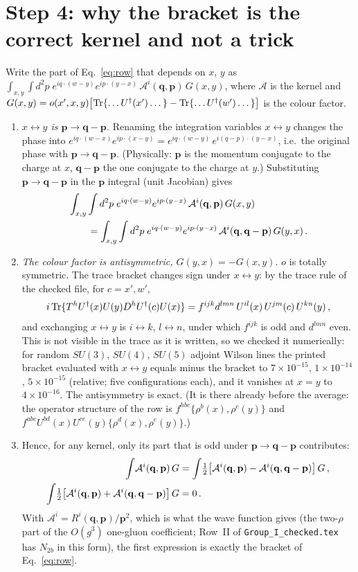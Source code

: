 \documentclass[11pt]{article}
\newcommand{\vq}{\mathbf{q}}
\newcommand{\vp}{\mathbf{p}}
\newcommand{\Tr}{{\rm Tr}}
\begin{document}
\section{Step 4: why the bracket is the correct kernel and not a trick}
Write the part of Eq.~\eqref{eq:row} that depends on $x$, $y$ as $\int_{x,y}\int d^{2}p\;e^{iq\cdot(w-y)}e^{ip\cdot(y-x)}\,\mathcal{A}^{i}(\vq,\vp)\,G(x,y)$, where $\mathcal{A}$ is the kernel and $G(x,y)=o(x',x,y)\big[\Tr\{\dots U^{\dagger}(x')\dots\}-\Tr\{\dots U^{\dagger}(w')\dots\}\big]$ is the colour factor.
\begin{enumerate}
\item \emph{$x\leftrightarrow y$ is $\vp\to\vq-\vp$.} Renaming the integration variables $x\leftrightarrow y$ changes the phase into
$e^{iq\cdot(w-x)}e^{ip\cdot(x-y)}=e^{iq\cdot(w-y)}\,e^{i(q-p)\cdot(y-x)}$, i.e.\ the original phase with $\vp\to\vq-\vp$. (Physically: $\vp$ is the momentum conjugate to the charge at $x$, $\vq-\vp$ the one conjugate to the charge at $y$.) Substituting $\vp\to\vq-\vp$ in the $\vp$ integral (unit Jacobian) gives
\begin{align}
&\int_{x,y}\int d^{2}p\;e^{iq\cdot(w-y)}e^{ip\cdot(y-x)}\,\mathcal{A}^{i}(\vq,\vp)\,G(x,y)\notag\\
&\qquad=\int_{x,y}\int d^{2}p\;e^{iq\cdot(w-y)}e^{ip\cdot(y-x)}\,\mathcal{A}^{i}(\vq,\vq-\vp)\,G(y,x)\,.
\end{align}
\item \emph{The colour factor is antisymmetric, $G(y,x)=-G(x,y)$.} $o$ is totally symmetric. The trace bracket changes sign under $x\leftrightarrow y$: by the trace rule of the checked file, for $c=x',w'$,
\[i\,\Tr\{T^{h}U^{\dagger}(x)U(y)D^{h}U^{\dagger}(c)U(x)\}=f^{ijk}d^{lmn}\,U^{il}(x)\,U^{jm}(c)\,U^{kn}(y)\,,\]
and exchanging $x\leftrightarrow y$ is $i\leftrightarrow k$, $l\leftrightarrow n$, under which $f^{ijk}$ is odd and $d^{lmn}$ even. This is not visible in the trace as it is written, so we checked it numerically: for random $SU(3)$, $SU(4)$, $SU(5)$ adjoint Wilson lines the printed bracket evaluated with $x\leftrightarrow y$ equals minus the bracket to $7\times10^{-15}$, $1\times10^{-14}$, $5\times10^{-15}$ (relative; five configurations each), and it vanishes at $x=y$ to $4\times10^{-16}$. The antisymmetry is exact. (It is there already before the average: the operator structure of the row is $f^{hbc}\{\rho^{b}(x),\rho^{c}(y)\}$ and $f^{abc}U^{bd}(x)U^{ce}(y)\{\rho^{d}(x),\rho^{e}(y)\}$.)
\item Hence, for any kernel, only its part that is odd under $\vp\to\vq-\vp$ contributes:
\begin{align}
\int\!\mathcal{A}^{i}(\vq,\vp)\,G&=\int\!\tfrac12\big[\mathcal{A}^{i}(\vq,\vp)-\mathcal{A}^{i}(\vq,\vq-\vp)\big]\,G\,,\notag\\
\int\!\tfrac12\big[\mathcal{A}^{i}(\vq,\vp)+\mathcal{A}^{i}(\vq,\vq-\vp)\big]\,G&=0\,.
\end{align}
With $\mathcal{A}^{i}=R^{i}(\vq,\vp)/\vp^{2}$, which is what the wave function gives (the two-$\rho$ part of the $O(g^{3})$ one-gluon coefficient; Row~II of \texttt{Group\_I\_checked.tex} has $N_{2b}$ in this form), the first expression is exactly the bracket of Eq.~\eqref{eq:row}.
\end{enumerate}
\end{document}

